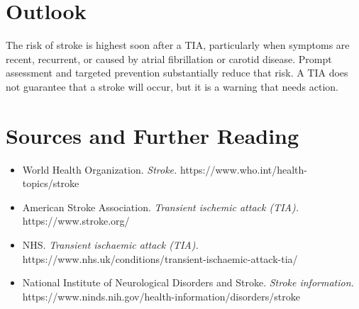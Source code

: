 \section*{Outlook}
The risk of stroke is highest soon after a TIA, particularly when symptoms are recent, recurrent, or caused by atrial fibrillation or carotid disease. Prompt assessment and targeted prevention substantially reduce that risk. A TIA does not guarantee that a stroke will occur, but it is a warning that needs action.

\section*{Sources and Further Reading}
\begin{itemize}
    \item World Health Organization. \textit{Stroke.} https://www.who.int/health-topics/stroke
    \item American Stroke Association. \textit{Transient ischemic attack (TIA).} https://www.stroke.org/
    \item NHS. \textit{Transient ischaemic attack (TIA).} https://www.nhs.uk/conditions/transient-ischaemic-attack-tia/
    \item National Institute of Neurological Disorders and Stroke. \textit{Stroke information.} https://www.ninds.nih.gov/health-information/disorders/stroke
\end{itemize}
